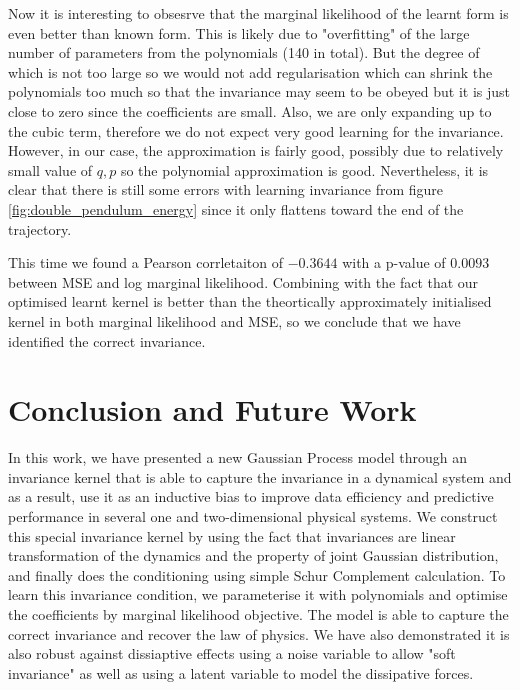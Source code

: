 \documentclass{statsmsc}
\begin{document}
Now it is interesting to obsesrve that the marginal likelihood of the learnt form is even better than known form.
This is likely due to "overfitting" of the large number of parameters from the polynomials (140 in total).
But the degree of which is not too large so we would not add regularisation which can shrink the polynomials too much so that the invariance may seem to be obeyed but it is just close to zero since the coefficients are small.
Also, we are only expanding up to the cubic term, therefore we do not expect very good learning for the invariance.
However, in our case, the approximation is fairly good, possibly due to relatively small value of $q, p$ so the polynomial approximation is good.
Nevertheless, it is clear that there is still some errors with learning invariance from figure \ref{fig:double_pendulum_energy} since it only flattens toward the end of the trajectory.

This time we found a Pearson corrletaiton of $-0.3644$ with a p-value of $0.0093$ between MSE and log marginal likelihood.
Combining with the fact that our optimised learnt kernel is better than the theortically approximately initialised kernel in both marginal likelihood and MSE, so we conclude that we have identified the correct invariance.  

\chapter{Conclusion and Future Work}
In this work, we have presented a new Gaussian Process model through an invariance kernel that is able to capture the invariance in a dynamical system and as a result, use it as an inductive bias to improve data efficiency and predictive performance in several one and two-dimensional physical systems. 
We construct this special invariance kernel by using the fact that invariances are linear transformation of the dynamics and the property of joint Gaussian distribution, and finally does the conditioning using simple Schur Complement calculation.
To learn this invariance condition, we parameterise it with polynomials and optimise the coefficients by marginal likelihood objective. 
The model is able to capture the correct invariance and recover the law of physics.
We have also demonstrated it is also robust against dissiaptive effects using a noise variable to allow "soft invariance" as well as using a latent variable to model the dissipative forces. 
\end{document}

